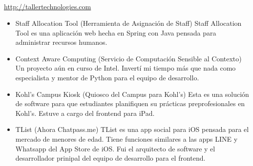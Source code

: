 \documentclass[11pt,a4paper,english]{moderncv}
\begin{document}
\subsection{}

{
\url{http://tallertechnologies.com}
\newline{}
\begin{itemize}
    \item Staff Allocation Tool (Herramienta de Asignación de Staff)
        \newline{}
        Staff Allocation Tool es una aplicación web hecha en Spring con Java pensada para administrar recursos humanos.
    \item Context Aware Computing (Servicio de Computación Sensible al Contexto)
        \newline{}
        Un proyecto aún en curso de Intel. Invertí mi tiempo más que nada como especialista y mentor de Python para el equipo de desarrollo.
    \item Kohl's Campus Kiosk (Quiosco del Campus para Kohl's)
        \newline{}
        Esta es una solución de software para que estudiantes planifiquen su prácticas preprofesionales en Kohl's. Estuve a cargo del frontend para iPad.
    \item TList (Ahora Chatpass.me)
        \newline{}
        TList es una app social para iOS pensada para el mercado de menores de edad. Tiene funciones similares a las apps LINE y Whatsapp del App Store de iOS. Fui el arquitecto de software y el desarrollador prinipal del equipo de desarrollo para el frontend.
\end{itemize}
}

\subsection{}
\end{document}
